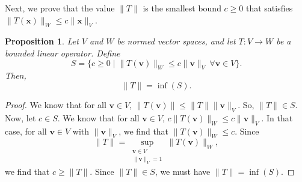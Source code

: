 \documentclass[a4paper, openany]{memoir}
\theoremstyle{definition}
\theoremstyle{plain}
\newtheorem{proposition}[definition]{Proposition}
\begin{document}
    \noindent Next, we prove that the value $\lVert T \rVert$ is the smallest bound $c \geq 0$ that satisfies $\lVert T(\bm{x}) \rVert_W \leq c \lVert \bm{x} \rVert_V$.
    \begin{proposition}
        Let $V$ and $W$ be normed vector spaces, and let $T: V \to W$ be a bounded linear operator. Define 
        \[S = \{c \geq 0 \mid \lVert T(\bm{v}) \rVert_W \leq c \lVert \bm{v} \rVert_V \ \forall \bm{v} \in V\}.\]
        Then,
        \[\lVert T \rVert = \inf (S).\]
    \end{proposition}
    \begin{proof}
        We know that for all $\bm{v} \in V$, $\lVert T(\bm{v}) \rVert \leq \lVert T \rVert \lVert \bm{v} \rVert_V$. So, $\lVert T \rVert \in S$. Now, let $c \in S$. We know that for all $\bm{v} \in V$, $c\lVert T(\bm{v}) \rVert_W \leq c \lVert \bm{v} \rVert_V$. In that case, for all $\bm{v} \in V$ with $\lVert \bm{v} \rVert_V$, we find that $\lVert T(\bm{v}) \rVert_W \leq c$. Since
        \[\lVert T \rVert = \sup_{\substack{\bm{v} \in V \\ \lVert \bm{v} \rVert_V = 1}} \lVert T(\bm{v}) \rVert_W,\]
        we find that $c \geq \lVert T \rVert$. Since $\lVert T \rVert \in S$, we must have $\lVert T \rVert = \inf (S)$.
    \end{proof}
\end{document}
